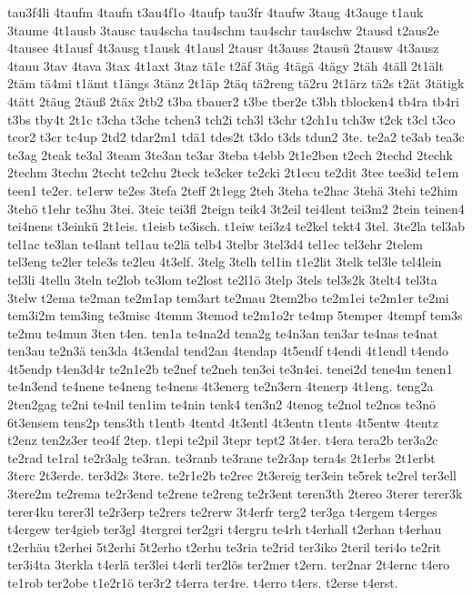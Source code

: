 {tau3f4li
4taufm
4taufn
t3au4f1o
4taufp
tau3fr
4taufw
3taug
4t3auge
t1auk
3taume
4t1ausb
3tausc
tau4scha
tau4schm
tau4schr
tau4schw
2tausd
t2aus2e
4tausee
4t1ausf
4t3ausg
t1ausk
4t1ausl
2tausr
4t3auss
2tausü
2tausw
4t3ausz
4tauu
3tav
4tava
3tax
4t1axt
3taz
tä1c
t2äf
3täg
4tägä
4tägy
2täh
4täll
2t1ält
2täm
tä4mi
t1ämt
t1ängs
3tänz
2t1äp
2täq
tä2reng
tä2ru
2t1ärz
tä2s
t2ät
3tätigk
4tätt
2täug
2täuß
2täx
2tb2
t3ba
tbauer2
t3be
tber2e
t3bh
tblocken4
tb4ra
tb4ri
t3bs
tby4t
2t1c
t3cha
t3che
tchen3
tch2i
tch3l
t3chr
t2ch1u
tch3w
t2ck
t3cl
t3co
tcor2
t3cr
tc4up
2td2
tdar2m1
tdä1
tdes2t
t3do
t3ds
tdun2
3te.
te2a2
te3ab
tea3c
te3ag
2teak
te3al
3team
3te3an
te3ar
3teba
t4ebb
2t1e2ben
t2ech
2techd
2techk
2techm
3techn
2techt
te2chu
2teck
te3cker
te2cki
2t1ecu
te2dit
3tee
tee3id
te1em
teen1
te2er.
te1erw
te2es
3tefa
2teff
2t1egg
2teh
3teha
te2hac
3tehä
3tehi
te2him
3tehö
t1ehr
te3hu
3tei.
3teic
tei3fl
2teign
teik4
3t2eil
tei4lent
tei3m2
2tein
teinen4
tei4nens
t3einkü
2t1eis.
t1eisb
te3isch.
t1eiw
tei3z4
te2kel
tekt4
3tel.
3te2la
tel3ab
tel1ac
te3lan
te4lant
tel1au
te2lä
telb4
3telbr
3tel3d4
tel1ec
tel3ehr
2telem
tel3eng
te2ler
tele3s
te2leu
4t3elf.
3telg
3telh
tel1in
t1e2lit
3telk
tel3le
tel4lein
tel3li
4tellu
3teln
te2lob
te3lom
te2lost
te2l1ö
3telp
3tels
tel3s2k
3telt4
tel3ta
3telw
t2ema
te2man
te2m1ap
tem3art
te2mau
2tem2bo
te2m1ei
te2m1er
te2mi
tem3i2m
tem3ing
te3misc
4temm
3temod
te2m1o2r
te4mp
5temper
4tempf
tem3s
te2mu
te4mun
3ten
t4en.
ten1a
te4na2d
tena2g
te4n3an
ten3ar
te4nas
te4nat
ten3au
te2n3ä
ten3da
4t3endal
tend2an
4tendap
4t5endf
t4endi
4t1endl
t4endo
4t5endp
t4en3d4r
te2n1e2b
te2nef
te2neh
ten3ei
te3n4ei.
tenei2d
tene4m
tenen1
te4n3end
te4nene
te4neng
te4nens
4t3energ
te2n3ern
4tenerp
4t1eng.
teng2a
2ten2gag
te2ni
te4nil
ten1im
te4nin
tenk4
ten3n2
4tenog
te2nol
te2nos
te3nö
6t3ensem
tens2p
tens3th
t1entb
4tentd
4t3entl
4t3entn
t1ents
4t5entw
4tentz
t2enz
ten2z3er
teo4f
2tep.
t1epi
te2pil
3tepr
tept2
3t4er.
t4era
tera2b
ter3a2c
te2rad
te1ral
te2r3alg
te3ran.
te3ranb
te3rane
te2r3ap
tera4s
2t1erbs
2t1erbt
3terc
2t3erde.
ter3d2s
3tere.
te2r1e2b
te2rec
2t3ereig
ter3ein
te5rek
te2rel
ter3ell
3tere2m
te2rema
te2r3end
te2rene
te2reng
te2r3ent
teren3th
2tereo
3terer
terer3k
terer4ku
terer3l
te2r3erp
te2rers
te2rerw
3t4erfr
terg2
ter3ga
t4ergem
t4erges
t4ergew
ter4gieb
ter3gl
4tergrei
ter2gri
t4ergru
te4rh
t4erhall
t2erhan
t4erhau
t2erhäu
t2erhei
5t2erhi
5t2erho
t2erhu
te3ria
te2rid
ter3iko
2teril
teri4o
te2rit
ter3i4ta
3terkla
t4erlä
ter3lei
t4erli
ter2lös
ter2mer
t2ern.
ter2nar
2t4ernc
t4ero
te1rob
ter2obe
t1e2r1ö
ter3r2
t4erra
ter4re.
t4erro
t4ers.
t2erse
t4erst.
}
